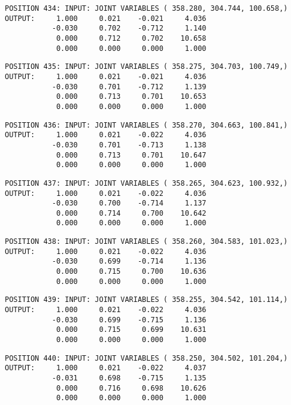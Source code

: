 \begin{verbatim}
POSITION 434: INPUT: JOINT VARIABLES ( 358.280, 304.744, 100.658,)
OUTPUT:     1.000     0.021    -0.021     4.036
           -0.030     0.702    -0.712     1.140
            0.000     0.712     0.702    10.658
            0.000     0.000     0.000     1.000
\end{verbatim} \pagebreak[1]\begin{verbatim}
POSITION 435: INPUT: JOINT VARIABLES ( 358.275, 304.703, 100.749,)
OUTPUT:     1.000     0.021    -0.021     4.036
           -0.030     0.701    -0.712     1.139
            0.000     0.713     0.701    10.653
            0.000     0.000     0.000     1.000
\end{verbatim} \pagebreak[1]\begin{verbatim}
POSITION 436: INPUT: JOINT VARIABLES ( 358.270, 304.663, 100.841,)
OUTPUT:     1.000     0.021    -0.022     4.036
           -0.030     0.701    -0.713     1.138
            0.000     0.713     0.701    10.647
            0.000     0.000     0.000     1.000
\end{verbatim} \pagebreak[1]\begin{verbatim}
POSITION 437: INPUT: JOINT VARIABLES ( 358.265, 304.623, 100.932,)
OUTPUT:     1.000     0.021    -0.022     4.036
           -0.030     0.700    -0.714     1.137
            0.000     0.714     0.700    10.642
            0.000     0.000     0.000     1.000
\end{verbatim} \pagebreak[1]\begin{verbatim}
POSITION 438: INPUT: JOINT VARIABLES ( 358.260, 304.583, 101.023,)
OUTPUT:     1.000     0.021    -0.022     4.036
           -0.030     0.699    -0.714     1.136
            0.000     0.715     0.700    10.636
            0.000     0.000     0.000     1.000
\end{verbatim} \pagebreak[1]\begin{verbatim}
POSITION 439: INPUT: JOINT VARIABLES ( 358.255, 304.542, 101.114,)
OUTPUT:     1.000     0.021    -0.022     4.036
           -0.030     0.699    -0.715     1.136
            0.000     0.715     0.699    10.631
            0.000     0.000     0.000     1.000
\end{verbatim} \pagebreak[1]\begin{verbatim}
POSITION 440: INPUT: JOINT VARIABLES ( 358.250, 304.502, 101.204,)
OUTPUT:     1.000     0.021    -0.022     4.037
           -0.031     0.698    -0.715     1.135
            0.000     0.716     0.698    10.626
            0.000     0.000     0.000     1.000
\end{verbatim} \pagebreak[1]\begin{verbatim}

\end{verbatim}
